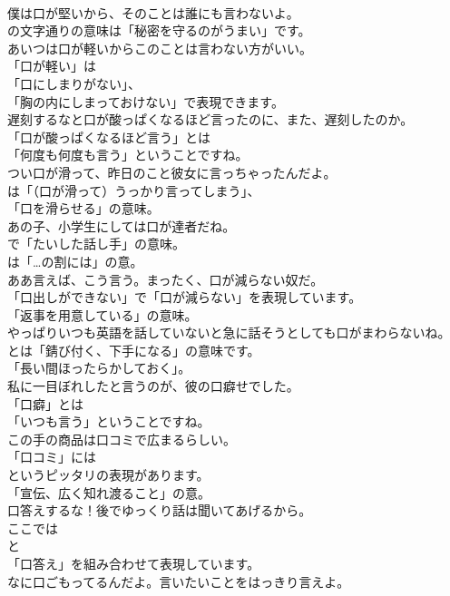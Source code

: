 \documentclass[8pt]{extreport}
\begin{document}
\begin{CJK}{UTF8}{min}
\\	僕は口が堅いから、そのことは誰にも言わないよ。 
\\	の文字通りの意味は「秘密を守るのがうまい」です。	
\\	あいつは口が軽いからこのことは言わない方がいい。 
\\	「口が軽い」は
\\	「口にしまりがない」、 
\\	「胸の内にしまっておけない」で表現できます。	
\\	遅刻するなと口が酸っぱくなるほど言ったのに、また、遅刻したのか。 
\\	「口が酸っぱくなるほど言う」とは
\\	「何度も何度も言う」ということですね。	
\\	つい口が滑って、昨日のこと彼女に言っちゃったんだよ。 
\\	は「（口が滑って）うっかり言ってしまう」、
\\	「口を滑らせる」の意味。	
\\	あの子、小学生にしては口が達者だね。 
\\	で「たいした話し手」の意味。
\\	は「…の割には」の意。	
\\	ああ言えば、こう言う。まったく、口が減らない奴だ。 
\\	「口出しができない」で「口が減らない」を表現しています。
\\	「返事を用意している」の意味。	
\\	やっぱりいつも英語を話していないと急に話そうとしても口がまわらないね。 
\\	とは「錆び付く、下手になる」の意味です。
\\	「長い間ほったらかしておく」。	
\\	私に一目ぼれしたと言うのが、彼の口癖せでした。 
\\	「口癖」とは
\\	「いつも言う」ということですね。	
\\	この手の商品は口コミで広まるらしい。 
\\	「口コミ」には
\\	というピッタリの表現があります。
\\	「宣伝、広く知れ渡ること」の意。	
\\	口答えするな！後でゆっくり話は聞いてあげるから。 
\\	ここでは
\\	と
\\	「口答え」を組み合わせて表現しています。	
\\	なに口ごもってるんだよ。言いたいことをはっきり言えよ。 

\end{CJK}
\end{document}
